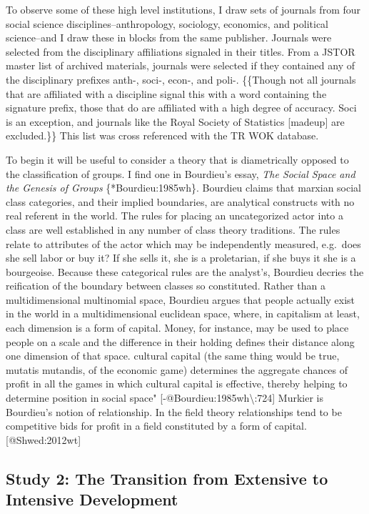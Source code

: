 \documentclass[]{article}
\begin{document}
To observe some of these high level institutions, I draw sets of
journals from four social science disciplines--anthropology, sociology,
economics, and political science--and I draw these in blocks from the
same publisher. Journals were selected from the disciplinary
affiliations signaled in their titles. From a JSTOR master list of
archived materials, journals were selected if they contained any of the
disciplinary prefixes anth-, soci-, econ-, and poli-. \{\{Though not all
journals that are affiliated with a discipline signal this with a word
containing the signature prefix, those that do are affiliated with a
high degree of accuracy. Soci is an exception, and journals like the
Royal Society of Statistics {[}madeup{]} are excluded.\}\} This list was
cross referenced with the TR WOK database.

To begin it will be useful to consider a theory that is diametrically
opposed to the classification of groups. I find one in Bourdieu's essay,
\emph{The Social Space and the Genesis of Groups} \{*Bourdieu:1985wh\}.
Bourdieu claims that marxian social class categories, and their implied
boundaries, are analytical constructs with no real referent in the
world. The rules for placing an uncategorized actor into a class are
well established in any number of class theory traditions. The rules
relate to attributes of the actor which may be independently measured,
e.g.~does she sell labor or buy it? If she sells it, she is a
proletarian, if she buys it she is a bourgeoise. Because these
categorical rules are the analyst's, Bourdieu decries the reification of
the boundary between classes so constituted. Rather than a
multidimensional multinomial space, Bourdieu argues that people actually
exist in the world in a multidimensional euclidean space, where, in
capitalism at least, each dimension is a form of capital. Money, for
instance, may be used to place people on a scale and the difference in
their holding defines their distance along one dimension of that space.
cultural capital (the same thing would be true, mutatis mutandis, of the
economic game) determines the aggregate chances of profit in all the
games in which cultural capital is effective, thereby helping to
determine position in social space"
{[}-@Bourdieu:1985wh\textbackslash{}:724{]} Murkier is Bourdieu's notion
of relationship. In the field theory relationships tend to be
competitive bids for profit in a field constituted by a form of capital.
{[}@Shwed:2012wt{]}

\subsection{Study 2: The Transition from Extensive to Intensive
Development}\label{study-2-the-transition-from-extensive-to-intensive-development}
\end{document}
